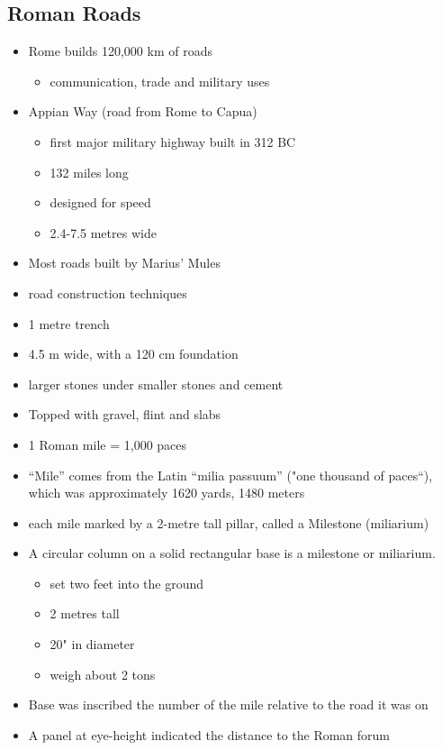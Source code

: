 \documentclass[12pt, twoside]{article}
\begin{document}
\subsection{Roman Roads}
\begin{itemize}
\item Rome builds 120,000 km of roads
	\begin{itemize}
	\item communication, trade and military uses
	\end{itemize}
\item Appian Way (road from Rome to Capua)
	\begin{itemize}
	\item first major military highway built in 312 BC
	\item 132 miles long
	\item designed for speed
	\item 2.4-7.5 metres wide
	\end{itemize}
\item Most roads built by Marius’ Mules
\item road construction techniques
\item 1 metre trench
\item 4.5 m wide, with a 120 cm foundation
\item larger stones under smaller stones and cement
\item Topped with gravel, flint and slabs
\item 1 Roman mile = 1,000 paces
\item “Mile” comes from the Latin “milia passuum” ("one thousand of paces“), which was approximately 1620 yards, 1480 meters
\item each mile marked by a 2-metre tall pillar, called a Milestone (miliarium)
\item A circular column on a solid rectangular base is a milestone or miliarium.
	\begin{itemize}
	\item set two feet into the ground
	\item 2 metres tall
	\item 20" in diameter
	\item weigh about 2 tons
	\end{itemize}
\item Base was inscribed the number of the mile relative to the road it was on
\item A panel at eye-height indicated the distance to the Roman forum
	\begin{itemize}

\end{itemize}
\end{itemize}
\end{document}
